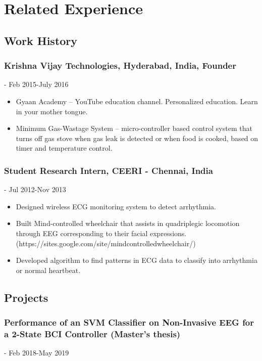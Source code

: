 \documentclass{article}
\begin{document}
\section{Related Experience}
\subsection{Work History}

\subsubsection{Krishna Vijay Technologies, Hyderabad, India, Founder} - Feb 2015-July 2016
\begin{itemize}
    \item Gyaan Academy -- YouTube education channel. Personalized education. Learn in your mother tongue.
    \item Minimum Gas-Wastage System -- micro-controller based control system that turns off gas stove when gas leak is detected or when food is cooked, based on timer and temperature control.
\end{itemize}
    
\subsubsection{Student Research Intern, CEERI - Chennai, India} - Jul 2012-Nov 2013
\begin{itemize}
    \item Designed wireless ECG monitoring system to detect arrhythmia.
    \item Built Mind-controlled wheelchair that assists in quadriplegic locomotion through EEG corresponding to their facial expressions.
    (https://sites.google.com/site/mindcontrolledwheelchair/)
    \item Developed algorithm to find patterns in ECG data to classify into arrhythmia or normal heartbeat.
\end{itemize}


\subsection{Projects}
\subsubsection{Performance of an SVM Classifier on Non-Invasive EEG for a 2-State BCI Controller (Master's thesis)} - Feb 2018-May 2019
\end{document}
